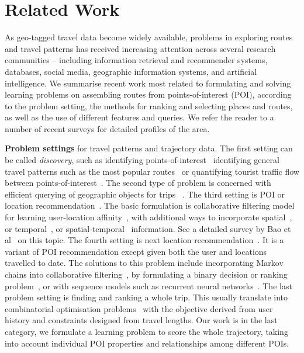 
\section{Related Work}
\label{sec:relatedwork}

As geo-tagged travel data become widely available, problems in exploring routes and travel patterns has received increasing attention across several research communities -- including information retrieval and recommender systems, databases, social media, geographic information systems, and artificial intelligence. 
We summarise recent work most related to formulating and solving learning problems on assembling routes 
from points-of-interest (POI), according to the problem setting, the methods for ranking and selecting places and routes, as well as the use of different features and queries. We refer the reader to a number of recent surveys\cite{bao2015recommendations,zheng2015trajectory,zheng2014urban} for detailed profiles of the area.

{\bf Problem settings} for travel patterns and trajectory data. 
The first setting can be called {\em discovery}, such as identifying points-of-interest~\cite{zheng2009mining,li2015instagram} identifying general travel patterns such as the most popular routes~\cite{lu2010photo2trip} or 
quantifying tourist traffic flow between points-of-interest~\cite{zheng2012patterns}. 
The second type of problem is concerned with efficient querying of geographic objects for trips ~\cite{hashem2015efficient}. 
The third setting is POI or location recommendation~\cite{bao2015recommendations,yin2015joint}. The basic formulation is collaborative filtering model for learning user-location affinity~\cite{shi2011personalized}, with additional ways to incorporate spatial~\cite{lian2014geomf,liu2014exploiting}, or temporal~\cite{yuan2013timeaware,hsieh2014mining,gao2013temporal}, or spatial-temporal~\cite{yuan2014graph} information. See a detailed survey by Bao et al~\cite{bao2015recommendations} on this topic. 
The fourth setting is next location recommendation~\cite{ijcai13,aaai16,baraglia2013learnext,zhang2015location}. It is a variant of POI recommendation except given both the user and locations travelled to date. The solutions to this problem include incorporating Markov chains into collaborative filtering~\cite{fpmc10,ijcai13,zhang2015location}, by formulating a binary decision or ranking problem~\cite{baraglia2013learnext}, or with sequence models such as recurrent neural networks~\cite{aaai16}. 
The last problem setting is finding and ranking a whole trip. This usually translate into combinatorial optimisation problems~\cite{ijcai15,lu2012personalized} with the objective derived from user history and constraints designed from travel lengths. 
Our work is in the last category, we formulate a learning problem to score the whole trajectory, taking into account individual POI properties and relationships among different POIs. 

